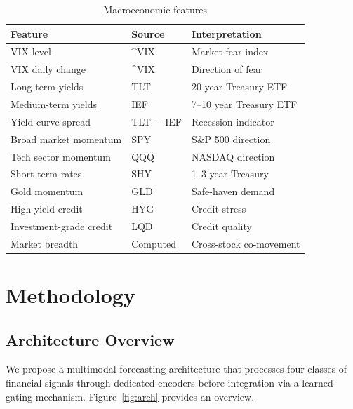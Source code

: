 \documentclass[12pt, a4paper]{article}
\begin{document}
\begin{table}[H]
\centering
\caption{Macroeconomic features}
\label{tab:macro}
\begin{tabular}{lll}
\toprule
\textbf{Feature} & \textbf{Source} & \textbf{Interpretation} \\
\midrule
VIX level              & \^{}VIX     & Market fear index \\
VIX daily change       & \^{}VIX     & Direction of fear \\
Long-term yields       & TLT         & 20-year Treasury ETF \\
Medium-term yields     & IEF         & 7--10 year Treasury ETF \\
Yield curve spread     & TLT $-$ IEF & Recession indicator \\
Broad market momentum  & SPY         & S\&P 500 direction \\
Tech sector momentum   & QQQ         & NASDAQ direction \\
Short-term rates       & SHY         & 1--3 year Treasury \\
Gold momentum          & GLD         & Safe-haven demand \\
High-yield credit      & HYG         & Credit stress \\
Investment-grade credit& LQD         & Credit quality \\
Market breadth         & Computed    & Cross-stock co-movement \\
\bottomrule
\end{tabular}
\end{table}


\section{Methodology}
\label{sec:method}

\subsection{Architecture Overview}

We propose a multimodal forecasting architecture that processes four classes of financial signals through dedicated encoders before integration via a learned gating mechanism. Figure~\ref{fig:arch} provides an overview.
\end{document}
